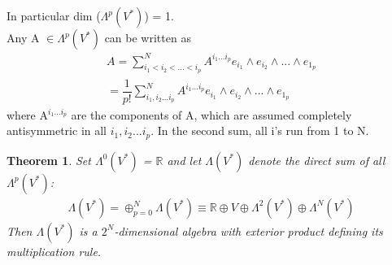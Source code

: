\documentclass[12pt,a4paper]{article}
\newtheorem{thm}{Theorem}
\begin{document}
In particular dim ($\Lambda^{p}(V^*)$) = 1.\\
\indent Any A $\in \Lambda^{p}(V^*)$ can be written as 
\begin{eqnarray*}
A = \sum^{N}_{i_1 < i_2 < ... < i_p} A^{i_1...i_p}  e_{i_1} \wedge e_{i_2} \wedge ... \wedge e_{1_p} \\
= \dfrac{1}{p!} \sum^{N}_{i_1,i_2 ... i_p} A^{i_1...i_p}  e_{i_1} \wedge e_{i_2} \wedge ... \wedge e_{1_p}
\end{eqnarray*}
where A$^{i_1...i_p}$ are the components of A, which are assumed completely antisymmetric in all $i_1,i_2 ... i_p$. In the second sum, all i’s run from 1 to N.\\
\begin{thm}
Set $\Lambda^{0}(V^*)$ = $\mathbb{R}$ and let $\Lambda(V^*)$ denote the direct
sum of all  $\Lambda^{p}(V^*)$:
\begin{eqnarray*}
\Lambda(V^*)  = \oplus^{N}_{p = 0}  \Lambda(V^*) \equiv \mathbb{R} \oplus V \oplus \Lambda^{2}(V^*) \oplus \Lambda^{N}(V^*)
\end{eqnarray*}
Then $\Lambda(V^*)$ is a $2^N$-dimensional algebra with exterior product defining its multiplication rule.	
\end{thm}
\end{document}
